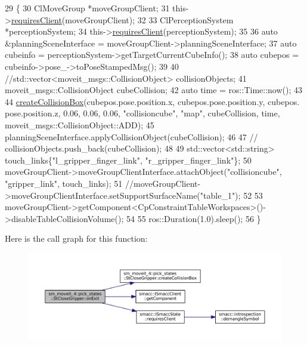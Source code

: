 \begin{DoxyCode}
29          \{
30             ClMoveGroup *moveGroupClient;
31             this->\hyperlink{classsmacc_1_1ISmaccState_a7f95c9f0a6ea2d6f18d1aec0519de4ac}{requiresClient}(moveGroupClient);
32 
33             ClPerceptionSystem *perceptionSystem;
34             this->\hyperlink{classsmacc_1_1ISmaccState_a7f95c9f0a6ea2d6f18d1aec0519de4ac}{requiresClient}(perceptionSystem);
35 
36             \textcolor{keyword}{auto} &planningSceneInterface = moveGroupClient->planningSceneInterface;
37             \textcolor{keyword}{auto} cubeinfo = perceptionSystem->getTargetCurrentCubeInfo();
38             \textcolor{keyword}{auto} cubepos = cubeinfo->pose\_->toPoseStampedMsg();
39 
40             \textcolor{comment}{//std::vector<moveit\_msgs::CollisionObject> collisionObjects;}
41             moveit\_msgs::CollisionObject cubeCollision;
42             \textcolor{keyword}{auto} time = ros::Time::now();
43 
44             \hyperlink{structsm__moveit__4_1_1pick__states_1_1StCloseGripper_a7522e4d331379b935519d24fd34ce39d}{createCollisionBox}(cubepos.pose.position.x, cubepos.pose.position.y, cubepos.
      pose.position.z, 0.06, 0.06, 0.06, \textcolor{stringliteral}{"collisioncube"}, \textcolor{stringliteral}{"map"},  cubeCollision, time, 
      moveit\_msgs::CollisionObject::ADD);
45             planningSceneInterface.applyCollisionObject(cubeCollision);
46 
47             \textcolor{comment}{// collisionObjects.push\_back(cubeCollision);}
48             
49             std::vector<std::string> touch\_links\{\textcolor{stringliteral}{"l\_gripper\_finger\_link"}, \textcolor{stringliteral}{"r\_gripper\_finger\_link"}\};
50             moveGroupClient->moveGroupClientInterface.attachObject(\textcolor{stringliteral}{"collisioncube"}, \textcolor{stringliteral}{"gripper\_link"}, 
      touch\_links);
51             \textcolor{comment}{//moveGroupClient->moveGroupClientInterface.setSupportSurfaceName("table\_1");}
52             
53             moveGroupClient->getComponent<CpConstraintTableWorkspaces>()->disableTableCollisionVolume();
54 
55             ros::Duration(1.0).sleep();
56          \}
\end{DoxyCode}
Here is the call graph for this function\+:
\nopagebreak
\begin{figure}[H]
\begin{center}
\leavevmode
\includegraphics[width=350pt]{structsm__moveit__4_1_1pick__states_1_1StCloseGripper_a427f4aec6a2173899b55e6a45ca28773_cgraph}
\end{center}
\end{figure}
